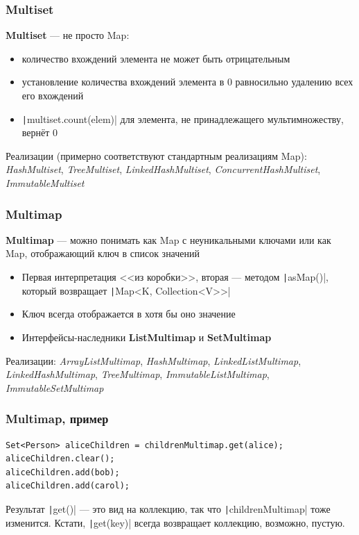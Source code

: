\documentclass[xetex,mathserif,serif]{beamer}
\begin{document}
	\begin{frame}
		\frametitle{Multiset}
		\textbf{Multiset} --- не просто Map:
		\begin{itemize}
			\item количество вхождений элемента не может быть отрицательным
			\item установление количества вхождений элемента в 0 равносильно удалению всех его вхождений
			\item \texttt|multiset.count(elem)| для элемента, не принадлежащего мультимножеству, вернёт 0
		\end{itemize}

		Реализации (примерно соответствуют стандартным реализациям Map): \textit{HashMultiset}, \textit{TreeMultiset}, \textit{LinkedHashMultiset}, \textit{ConcurrentHashMultiset}, \textit{ImmutableMultiset}
	\end{frame}

	\begin{frame}
		\frametitle{Multimap}
		\textbf{Multimap} --- можно понимать как Map с неуникальными ключами или как Map, отображающий ключ в список значений
		\begin{itemize}
			\item Первая интерпретация <<из коробки>>, вторая --- методом \texttt|asMap()|, который возвращает \texttt|Map<K, Collection<V>>|
			\item Ключ всегда отображается в хотя бы оно значение
			\item Интерфейсы-наследники \textbf{ListMultimap} и \textbf{SetMultimap}
		\end{itemize}

		Реализации: \textit{ArrayListMultimap}, \textit{HashMultimap}, \textit{LinkedListMultimap}, \textit{LinkedHashMultimap}, \textit{TreeMultimap}, \textit{ImmutableListMultimap}, \textit{ImmutableSetMultimap}
	\end{frame}

	\begin{frame}[fragile]
		\frametitle{Multimap, пример}
		\begin{verbatim}
Set<Person> aliceChildren = childrenMultimap.get(alice);
aliceChildren.clear();
aliceChildren.add(bob);
aliceChildren.add(carol);
		\end{verbatim}
		Результат \texttt|get()| --- это вид на коллекцию, так что \texttt|childrenMultimap| тоже изменится. Кстати, \texttt|get(key)| всегда возвращает коллекцию, возможно, пустую.
\end{frame}
\end{document}
